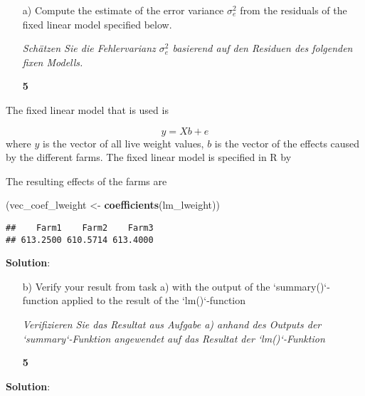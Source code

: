 \documentclass[
]{article}
\newenvironment{Shaded}{\begin{snugshade}}{\end{snugshade}}
\newcommand{\DataTypeTok}[1]{\textcolor[rgb]{0.13,0.29,0.53}{#1}}
\newcommand{\DecValTok}[1]{\textcolor[rgb]{0.00,0.00,0.81}{#1}}
\newcommand{\KeywordTok}[1]{\textcolor[rgb]{0.13,0.29,0.53}{\textbf{#1}}}
\newcommand{\NormalTok}[1]{#1}
\newcommand{\OperatorTok}[1]{\textcolor[rgb]{0.81,0.36,0.00}{\textbf{#1}}}
\newcommand{\StringTok}[1]{\textcolor[rgb]{0.31,0.60,0.02}{#1}}
\newcommand{\points}[1]
{\begin{flushright}\textbf{#1}\end{flushright}}
\newcommand{\solstart}
{\vspace{3ex}\textbf{Solution}:}
\begin{document}
\begin{enumerate}
\item[a)] Compute the estimate of the error variance $\sigma_e^2$ from the residuals of the fixed linear model specified below.

\textit{Schätzen Sie die Fehlervarianz $\sigma_e^2$ basierend auf den Residuen des folgenden fixen Modells.}
\points{5}
\end{enumerate}

The fixed linear model that is used is

\[y = Xb + e\] where \(y\) is the vector of all live weight values,
\(b\) is the vector of the effects caused by the different farms. The
fixed linear model is specified in R by

\begin{Shaded}
\end{Shaded}

The resulting effects of the farms are

\begin{Shaded}
\begin{Highlighting}[]
\NormalTok{(vec_coef_lweight <-}\StringTok{ }\KeywordTok{coefficients}\NormalTok{(lm_lweight))}
\end{Highlighting}
\end{Shaded}

\begin{verbatim}
##    Farm1    Farm2    Farm3 
## 613.2500 610.5714 613.4000
\end{verbatim}

\solstart

\clearpage
\pagebreak

\begin{enumerate}
\item[b)] Verify your result from task a) with the output of the `summary()`-function applied to the result of the `lm()`-function

\textit{Verifizieren Sie das Resultat aus Aufgabe a) anhand des Outputs der `summary`-Funktion angewendet auf das Resultat der `lm()`-Funktion}
\points{5}
\end{enumerate}

\solstart
\end{document}
